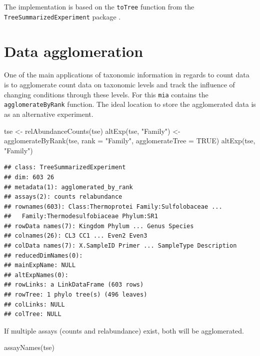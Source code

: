 \documentclass[
]{book}
\newenvironment{Shaded}{\begin{snugshade}}{\end{snugshade}}
\newcommand{\AttributeTok}[1]{\textcolor[rgb]{0.77,0.63,0.00}{#1}}
\newcommand{\ConstantTok}[1]{\textcolor[rgb]{0.00,0.00,0.00}{#1}}
\newcommand{\FunctionTok}[1]{\textcolor[rgb]{0.00,0.00,0.00}{#1}}
\newcommand{\NormalTok}[1]{#1}
\newcommand{\OtherTok}[1]{\textcolor[rgb]{0.56,0.35,0.01}{#1}}
\newcommand{\StringTok}[1]{\textcolor[rgb]{0.31,0.60,0.02}{#1}}
\begin{document}
The implementation is based on the \texttt{toTree} function from the
\texttt{TreeSummarizedExperiment} package \citep{R-TreeSummarizedExperiment}.

\hypertarget{data-agglomeration}{%
\section{Data agglomeration}\label{data-agglomeration}}

One of the main applications of taxonomic information in regards to count data
is to agglomerate count data on taxonomic levels and track the influence of
changing conditions through these levels. For this \texttt{mia} contains the
\texttt{agglomerateByRank} function. The ideal location to store the agglomerated data
is as an alternative experiment.

\begin{Shaded}
\begin{Highlighting}[]
\NormalTok{tse }\OtherTok{\textless{}{-}} \FunctionTok{relAbundanceCounts}\NormalTok{(tse)}
\FunctionTok{altExp}\NormalTok{(tse, }\StringTok{"Family"}\NormalTok{) }\OtherTok{\textless{}{-}} \FunctionTok{agglomerateByRank}\NormalTok{(tse, }\AttributeTok{rank =} \StringTok{"Family"}\NormalTok{,}
                                           \AttributeTok{agglomerateTree =} \ConstantTok{TRUE}\NormalTok{)}
\FunctionTok{altExp}\NormalTok{(tse, }\StringTok{"Family"}\NormalTok{)}
\end{Highlighting}
\end{Shaded}

\begin{verbatim}
## class: TreeSummarizedExperiment 
## dim: 603 26 
## metadata(1): agglomerated_by_rank
## assays(2): counts relabundance
## rownames(603): Class:Thermoprotei Family:Sulfolobaceae ...
##   Family:Thermodesulfobiaceae Phylum:SR1
## rowData names(7): Kingdom Phylum ... Genus Species
## colnames(26): CL3 CC1 ... Even2 Even3
## colData names(7): X.SampleID Primer ... SampleType Description
## reducedDimNames(0):
## mainExpName: NULL
## altExpNames(0):
## rowLinks: a LinkDataFrame (603 rows)
## rowTree: 1 phylo tree(s) (496 leaves)
## colLinks: NULL
## colTree: NULL
\end{verbatim}

If multiple assays (counts and relabundance) exist, both will be agglomerated.

\begin{Shaded}
\begin{Highlighting}[]
\FunctionTok{assayNames}\NormalTok{(tse)}
\end{Highlighting}
\end{Shaded}
\end{document}
